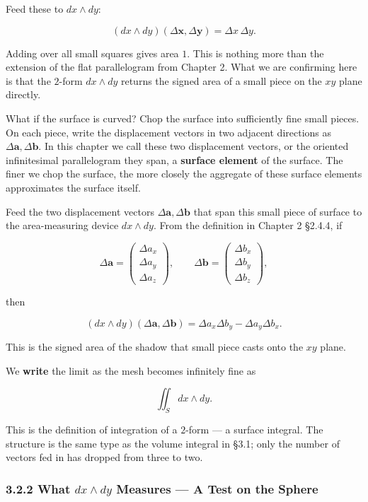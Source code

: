 \documentclass[a4paper,12pt,openany]{book}
\begin{document}
Feed these to \(dx \wedge dy\):

\[(dx \wedge dy)(\Delta\mathbf{x},\Delta\mathbf{y})=\Delta x\,\Delta y.\]

Adding over all small squares gives area \(1\). This is nothing more
than the extension of the flat parallelogram from Chapter 2. What we are
confirming here is that the \(2\)-form \(dx\wedge dy\) returns the
signed area of a small piece on the \(xy\) plane directly.

What if the surface is curved? Chop the surface into sufficiently fine
small pieces. On each piece, write the displacement vectors in two
adjacent directions as \(\Delta\mathbf{a},\Delta\mathbf{b}\). In this
chapter we call these two displacement vectors, or the oriented
infinitesimal parallelogram they span, a \textbf{surface element} of the
surface. The finer we chop the surface, the more closely the aggregate
of these surface elements approximates the surface itself.

Feed the two displacement vectors \(\Delta\mathbf{a},\Delta\mathbf{b}\)
that span this small piece of surface to the area-measuring device
\(dx \wedge dy\). From the definition in Chapter 2 §2.4.4, if

\[\Delta\mathbf{a}=\begin{pmatrix}\Delta a_x\\\Delta a_y\\\Delta a_z\end{pmatrix},\qquad
\Delta\mathbf{b}=\begin{pmatrix}\Delta b_x\\\Delta b_y\\\Delta b_z\end{pmatrix},\]

then

\[(dx \wedge dy)(\Delta\mathbf{a},\Delta\mathbf{b})
=\Delta a_x\Delta b_y-\Delta a_y\Delta b_x.\]

This is the signed area of the shadow that small piece casts onto the
\(xy\) plane.

We \textbf{write} the limit as the mesh becomes infinitely fine as

\[\iint_S dx \wedge dy.\]

This is the definition of integration of a \(2\)-form — a surface
integral. The structure is the same type as the volume integral in §3.1;
only the number of vectors fed in has dropped from three to two.

\hypertarget{what-dx-wedge-dy-measures-a-test-on-the-sphere}{%
\subsubsection{\texorpdfstring{3.2.2 What \(dx \wedge dy\) Measures —
A Test on the
Sphere}{3.2.2 What dx \textbackslash wedge dy Measures — A Test on the Sphere}}\label{what-dx-wedge-dy-measures-a-test-on-the-sphere}}
\end{document}
